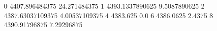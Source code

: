 0 4407.896484375 24.271484375
1 4393.1337890625 9.5087890625
2 4387.63037109375 4.00537109375
4 4383.625 0.0
6 4386.0625 2.4375
8 4390.91796875 7.29296875
